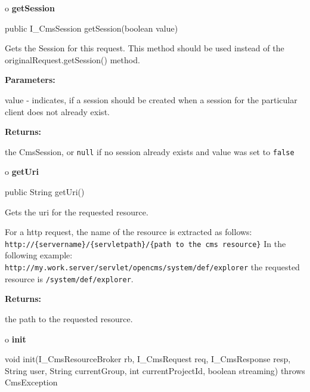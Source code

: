 o {\bf getSession} 

\begin{PRE}
 public I\_CmsSession getSession(boolean value)
\end{PRE}

\begin{description}
\htmlDD Gets the Session for this request. \htmlBR
This method should be used instead of the originalRequest.getSession() method.


\begin{description}
\item {\bf Parameters:}  

value - indicates, if a session should be created when a session for the
particular client does not already exist.  
\item {\bf Returns:}  

the CmsSession, or {\tt null} if no session already exists and value was set
to {\tt false}  
\end{description}

\end{description}

o {\bf getUri} 

\begin{PRE}
 public String getUri()
\end{PRE}

\begin{description}
\htmlDD Gets the uri for the requested resource. 

For a http request, the name of the resource is extracted as follows:\htmlBR
{\tt http://\{servername\}/\{servletpath\}/\{path to the cms
resource\}}\htmlBR
In the following example:\htmlBR
{\tt http://my.work.server/servlet/opencms/system/def/explorer}\htmlBR
the requested resource is {\tt /system/def/explorer}. 

\begin{description}
\item {\bf Returns:}  

the path to the requested resource.  
\end{description}

\end{description}

o {\bf init} 

\begin{PRE}
 void init(I\_CmsResourceBroker rb,
           I\_CmsRequest req,
           I\_CmsResponse resp,
           String user,
           String currentGroup,
           int currentProjectId,
           boolean streaming) throws CmsException
\end{PRE}

